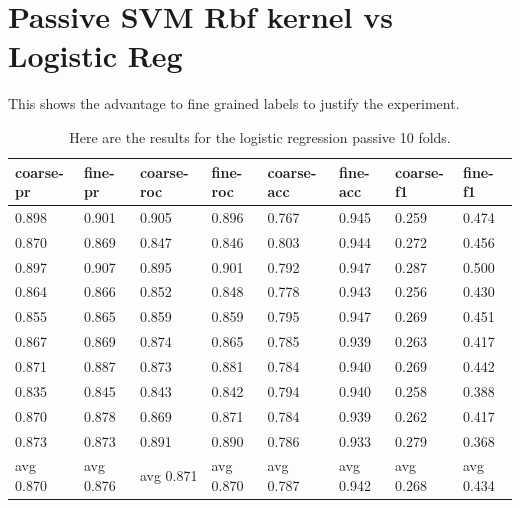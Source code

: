 \documentclass[ms]{nuthesis}
\begin{document}
\section{Passive SVM Rbf kernel vs Logistic Reg}
\par This shows the advantage to fine grained labels to justify the experiment.
\FloatBarrier
\begin{table}[h]
  \centering
  \begin{tabular}{|l||l||l||l||l||l||l||l|}\toprule
    coarse-pr & fine-pr & coarse-roc & fine-roc & coarse-acc & fine-acc & coarse-f1 & fine-f1 \\ \midrule
    0.898 & 0.901 & 0.905 & 0.896 & 0.767 & 0.945 & 0.259 & 0.474 \\
    0.870 & 0.869 & 0.847 & 0.846 & 0.803 & 0.944 & 0.272 & 0.456 \\
    0.897 & 0.907 & 0.895 & 0.901 & 0.792 & 0.947 & 0.287 & 0.500 \\
    0.864 & 0.866 & 0.852 & 0.848 & 0.778 & 0.943 & 0.256 & 0.430 \\
    0.855 & 0.865 & 0.859 & 0.859 & 0.795 & 0.947 & 0.269 & 0.451 \\
    0.867 & 0.869 & 0.874 & 0.865 & 0.785 & 0.939 & 0.263 & 0.417 \\
    0.871 & 0.887 & 0.873 & 0.881 & 0.784 & 0.940 & 0.269 & 0.442 \\
    0.835 & 0.845 & 0.843 & 0.842 & 0.794 & 0.940 & 0.258 & 0.388 \\
    0.870 & 0.878 & 0.869 & 0.871 & 0.784 & 0.939 & 0.262 & 0.417 \\
    0.873 & 0.873 & 0.891 & 0.890 & 0.786 & 0.933 & 0.279 & 0.368 \\
    avg 0.870 & avg 0.876 & avg 0.871 & avg 0.870 & avg 0.787 & avg 0.942 & avg 0.268 & avg 0.434 \\ \bottomrule
  \end{tabular}
  \caption{Here are the results for the logistic regression passive 10 folds.}
  \label{tab:logReg}
\end{table}
\FloatBarrier
\end{document}
